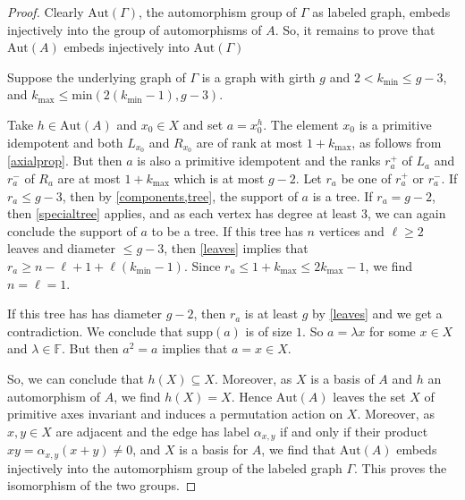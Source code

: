 \documentclass[oneside,a4paper]{amsart} %
\theoremstyle{definition}
\begin{document}
\begin{proof}
Clearly $\mathrm{Aut}(\Gamma)$, the automorphism group of $\Gamma$ as labeled graph, embeds injectively into the  group of automorphisms of $A$.
So, it remains to prove that $\mathrm{Aut}(A)$ embeds injectively into $\mathrm{Aut}(\Gamma)$

Suppose the underlying graph of $\Gamma$ is a graph with girth $g$ and $2<k_\mathrm{min}\leq g-3$, 
and $k_\mathrm{max}\leq\mathrm{min}(2(k_\mathrm{min}-1),g-3)$. 


Take $h\in \mathrm{Aut}(A)$  and $x_0\in X$ and set $a=x_0^h$.
The element $x_0$ is a primitive idempotent and both $L_{x_0}$ and $R_{x_0}$ are of  rank at most $1+k_\mathrm{max}$, as follows from \cref{axialprop}.
But then $a$ is also a primitive idempotent and the  ranks $r^+_a$ of $L_a$ and $r^-_a$ of $R_a$   are at most $1+k_\mathrm{max}$ which is at most $g-2$.
Let  $r_a$ be one of  $r^+_a$ or $r^-_a$.
If $r_a\leq g-3$, then by \cref{components,tree}, the support of $a$ is a tree.
If $r_a=g-2$, then \cref{specialtree} applies, and as each vertex has degree at least $3$, we can again conclude
the support of $a$ to be a tree.
If this tree has $n$ vertices and  $\ell\geq 2$ leaves and diameter $\leq g-3$, 
then  \cref{leaves} implies that $r_a\geq n-\ell +1+\ell(k_\mathrm{min}-1)$. 
Since $r_a\leq 1+k_{\mathrm{max}}\leq 2k_{\mathrm{max}}-1$, we find $n=\ell=1$.

If this tree has  has diameter $g-2$, then $r_a$ is at least $g$ by \cref{leaves} and we get a contradiction.
We conclude that $\mathrm{supp}(a)$ is of size $1$.
So $a=\lambda x$ for some $x\in X$ and $\lambda\in \mathbb{F}$.
But then $a^2=a$ implies that $a=x\in X$.

So, we can conclude that $h(X)\subseteq X$. Moreover, as $X$ is a basis of $A$ and $h$ an automorphism of $A$, we find $h(X)=X$.
Hence $\mathrm{Aut}(A)$ leaves the set $X$ of primitive axes invariant and induces a permutation action on  $X$.  
Moreover, as $x,y\in X$ are adjacent and the edge has label $\alpha_{x,y}$ if and only if their product $xy=\alpha_{x,y}(x+y)\neq 0$, 
and $X$ is a basis for $A$, we find that $\mathrm{Aut}(A)$ embeds injectively into the automorphism group of the labeled graph $\Gamma$.
This proves the isomorphism of the two groups.
\end{proof}
\end{document}
